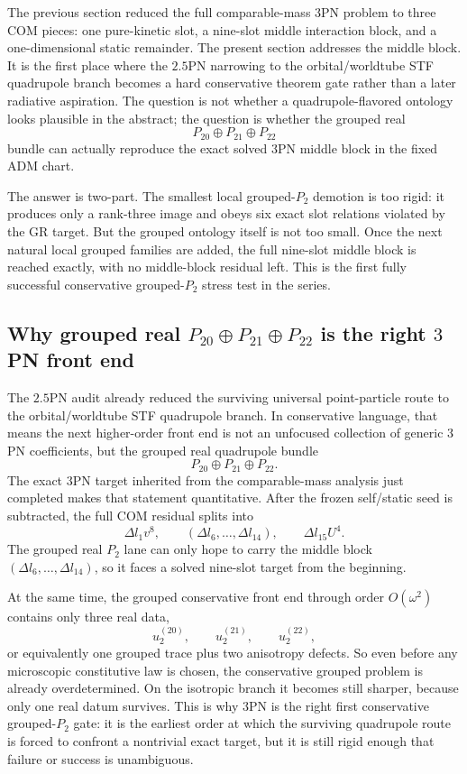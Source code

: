 \documentclass[11pt]{article}
\begin{document}
The previous section reduced the full comparable-mass $3$PN problem to three COM
pieces: one pure-kinetic slot, a nine-slot middle interaction block, and a
one-dimensional static remainder.  The present section addresses the middle
block.  It is the first place where the $2.5$PN narrowing to the
orbital/worldtube STF quadrupole branch becomes a hard conservative theorem gate
rather than a later radiative aspiration.  The question is not whether a
quadrupole-flavored ontology looks plausible in the abstract; the question is
whether the grouped real
\[
P_{20}\oplus P_{21}\oplus P_{22}
\]
bundle can actually reproduce the exact solved $3$PN middle block in the fixed
ADM chart.

The answer is two-part.  The smallest local grouped-$P_2$ demotion is too rigid:
it produces only a rank-three image and obeys six exact slot relations violated
by the GR target.  But the grouped ontology itself is not too small.  Once the
next natural local grouped families are added, the full nine-slot middle block
is reached exactly, with no middle-block residual left.  This is the first fully
successful conservative grouped-$P_2$ stress test in the series.

\subsection{Why grouped real \texorpdfstring{$P_{20}\oplus P_{21}\oplus P_{22}$}{P 20 + P 21 + P 22} is the right \texorpdfstring{$3$}{3}PN front end}
\label{sec:grouped-why}

The $2.5$PN audit already reduced the surviving universal point-particle route
to the orbital\allowbreak/worldtube STF quadrupole branch.  In conservative language, that
means the next higher-order front end is not an unfocused collection of generic
$3$PN coefficients, but the grouped real quadrupole bundle
\[
P_{20}\oplus P_{21}\oplus P_{22}.
\]
The exact $3$PN target inherited from the comparable-mass analysis just completed makes that statement
quantitative.  After the frozen self/static seed is subtracted, the full COM
residual splits into
\[
\Delta l_1 v^8,
\qquad
(\Delta l_6,\dots,\Delta l_{14}),
\qquad
\Delta l_{15}U^4.
\]
The grouped real $P_2$ lane can only hope to carry the middle block
\((\Delta l_6,\dots,\Delta l_{14})\), so it faces a solved nine-slot target from
the beginning.

At the same time, the grouped conservative front end through order
$O(\omega^2)$ contains only three real data,
\[
u_2^{(20)},\qquad u_2^{(21)},\qquad u_2^{(22)},
\]
or equivalently one grouped trace plus two anisotropy defects.  So even before
any microscopic constitutive law is chosen, the conservative grouped problem is
already overdetermined.  On the isotropic branch it becomes still sharper,
because only one real datum survives.  This is why $3$PN is the right first
conservative grouped-$P_2$ gate: it is the earliest order at which the surviving
quadrupole route is forced to confront a nontrivial exact target, but it is
still rigid enough that failure or success is unambiguous.
\end{document}
